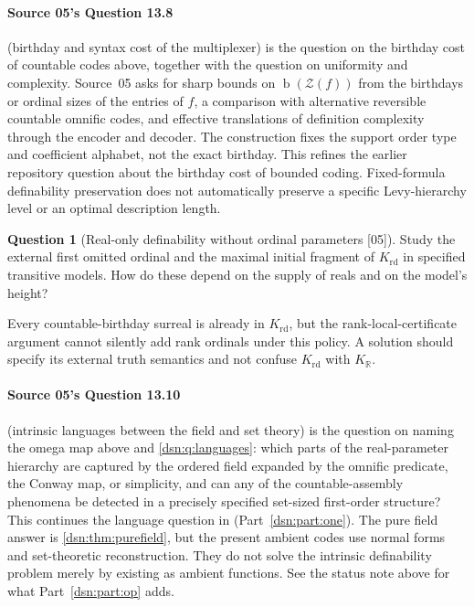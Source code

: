 \documentclass[11pt,a4paper]{article}
\numberwithin{equation}{section}
\theoremstyle{definition}
\newtheorem{question}[question]{Question}
\theoremstyle{remark}
\newcommand{\R}{\mathbb R}
\newcommand{\bd}{\operatorname{b}}
\newcommand{\src}[1]{\textup{\textsf{\small[#1]}}}
\newcommand{\KR}{K_{\R}}
\newcommand{\Zc}{\mathcal Z}
\begin{document}
\paragraph{Source 05's Question 13.8} (birthday and syntax cost of the
multiplexer) is the question on the birthday cost of countable codes above,
together with the question on uniformity and complexity. Source~05 asks for
sharp bounds on $\bd(\Zc(f))$ from the birthdays or ordinal sizes of the
entries of $f$, a comparison with alternative reversible countable omnific
codes, and effective translations of definition complexity through the
encoder and decoder.
The construction fixes the support order type and coefficient alphabet,
not the exact birthday. This refines the earlier repository question
about the birthday cost of bounded coding. Fixed-formula definability
preservation does not automatically preserve a specific Levy-hierarchy
level or an optimal description length.

\begin{question}[Real-only definability without ordinal parameters \src{05}]
Study the external first omitted ordinal and the maximal initial
fragment of $K_{\mathrm{rd}}$ in specified transitive models. How do
these depend on the supply of reals and on the model's height?
\end{question}
Every countable-birthday surreal is already in $K_{\mathrm{rd}}$,
but the rank-local-certificate argument cannot silently add rank
ordinals under this policy. A solution should specify its external
truth semantics and not confuse $K_{\mathrm{rd}}$ with $\KR$.

\paragraph{Source 05's Question 13.10} (intrinsic languages between the field
and set theory) is the question on naming the omega map above and
\cref{dsn:q:languages}: which parts of the real-parameter hierarchy are
captured by the ordered field expanded by the omnific predicate, the Conway
map, or simplicity, and can any of the countable-assembly phenomena be
detected in a precisely specified set-sized first-order structure?
This continues the language question in (Part~\ref{dsn:part:one}). The pure field
answer is \cref{dsn:thm:purefield}, but the present ambient codes use
normal forms and set-theoretic reconstruction. They do not solve the
intrinsic definability problem merely by existing as ambient functions.
See the status note above for what Part~\ref{dsn:part:op} adds.
\end{document}
